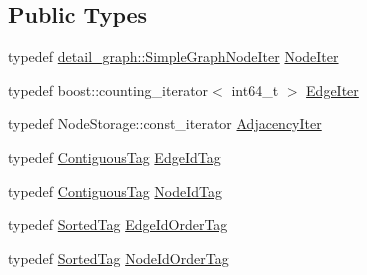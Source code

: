 \subsection*{Public Types}
\begin{DoxyCompactItemize}
\item 
typedef \hyperlink{classnifty_1_1graph_1_1detail__graph_1_1SimpleGraphNodeIter}{detail\+\_\+graph\+::\+Simple\+Graph\+Node\+Iter} \hyperlink{classnifty_1_1graph_1_1UndirectedGraph_aac54e4ad3a525489e9b29c1bd4c92c88}{Node\+Iter}
\item 
typedef boost\+::counting\+\_\+iterator$<$ int64\+\_\+t $>$ \hyperlink{classnifty_1_1graph_1_1UndirectedGraph_aa37a0dc690ad1257d5eb5105e7d66bba}{Edge\+Iter}
\item 
typedef Node\+Storage\+::const\+\_\+iterator \hyperlink{classnifty_1_1graph_1_1UndirectedGraph_adecb4597d23d097b08c2c03a106bc57b}{Adjacency\+Iter}
\item 
typedef \hyperlink{structnifty_1_1graph_1_1ContiguousTag}{Contiguous\+Tag} \hyperlink{classnifty_1_1graph_1_1UndirectedGraph_a5e5a59e9d25ab322da5e8286cadc3e00}{Edge\+Id\+Tag}
\item 
typedef \hyperlink{structnifty_1_1graph_1_1ContiguousTag}{Contiguous\+Tag} \hyperlink{classnifty_1_1graph_1_1UndirectedGraph_a5d11b1e802f0be2f967b62f7ea5ff61e}{Node\+Id\+Tag}
\item 
typedef \hyperlink{structnifty_1_1graph_1_1SortedTag}{Sorted\+Tag} \hyperlink{classnifty_1_1graph_1_1UndirectedGraph_a2f74e8de961bf80dc037ceedf58c46a4}{Edge\+Id\+Order\+Tag}
\item 
typedef \hyperlink{structnifty_1_1graph_1_1SortedTag}{Sorted\+Tag} \hyperlink{classnifty_1_1graph_1_1UndirectedGraph_a0756fdeac9df76a32f46f2969ffacd80}{Node\+Id\+Order\+Tag}
\end{DoxyCompactItemize}

